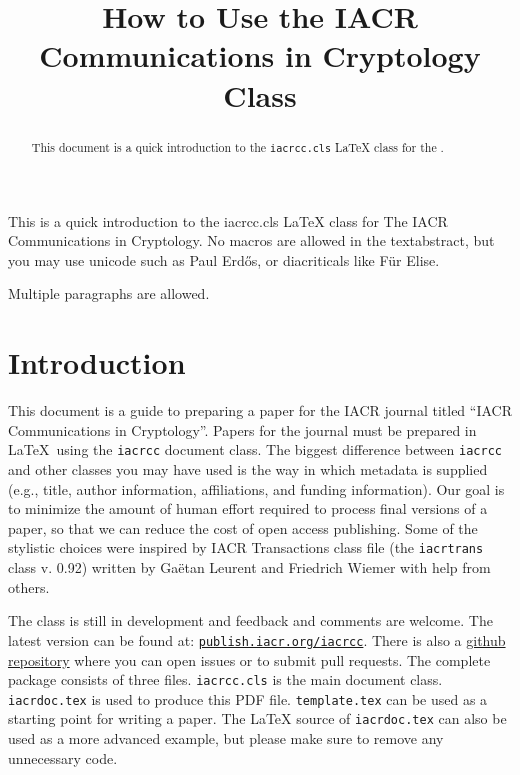 \documentclass{iacrcc}
\title[running  = {The iacrcc class},
       subtitle = {iacrcc LaTeX Class Documentation (v0.35)}
      ]{How to Use the IACR Communications in Cryptology Class}
\begin{document}
\maketitle


\begin{abstract}
  This document is a quick introduction to the \texttt{iacrcc.cls}
  \LaTeX{} class for the \publname{}.
\end{abstract}

\begin{textabstract}
This is a quick introduction to the iacrcc.cls LaTeX class for
The IACR Communications in Cryptology. No macros are allowed in
the textabstract, but you may use unicode such as Paul Erdős, or
diacriticals like F\"ur Elise.

Multiple paragraphs are allowed.
\end{textabstract}

\section*{Introduction}

This document is a guide to preparing a paper for the IACR journal
titled ``IACR Communications in Cryptology''.  Papers for the journal
must be prepared in \LaTeX\ using the \texttt{iacrcc} document
class. The biggest difference between \texttt{iacrcc} and other
classes you may have used is the way in which metadata is supplied
(e.g., title, author information, affiliations, and funding
information). Our goal is to minimize the amount of human effort
required to process final versions of a paper, so that we can reduce
the cost of open access publishing.  Some of the stylistic choices
were inspired by IACR Transactions class file (the \texttt{iacrtrans}
class v. 0.92) written by Ga{\"e}tan Leurent and Friedrich Wiemer with
help from others.

The class is still in development and feedback and comments are
welcome.  The latest version can be found at:
\href{https://publish.iacr.org/iacrcc}{\texttt{publish.iacr.org/iacrcc}}.
There is also a \href{https://github.com/IACR/latex}{github
  repository} where you can open issues or to submit pull requests.
The complete package consists of three files. \texttt{iacrcc.cls} is
the main document class. \texttt{iacrdoc.tex} is used to produce this PDF
file. \texttt{template.tex} can be used as a starting point for
writing a paper.  The \LaTeX{} source of \texttt{iacrdoc.tex} can also
be used as a more advanced example, but please make sure to remove any
unnecessary code.
\end{document}
